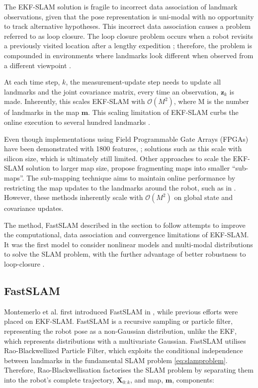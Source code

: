 The EKF-SLAM solution is fragile to incorrect data association of landmark observations, given that the pose representation is uni-modal with no opportunity to track alternative hypotheses. This incorrect data association causes a problem referred to as loop closure. The loop closure problem occurs when a robot revisits a previously visited location after a lengthy expedition \cite{Balcilar2016}; therefore, the problem is compounded in environments where landmarks look different when observed from a different viewpoint \cite{976019}. 

At each time step, $k$, the measurement-update step needs to update all landmarks and the joint covariance matrix, every time an observation, $\mathbf{z}_k$ is made. Inherently, this scales EKF-SLAM with $\mathcal{O}(M^2)$, where M is the number of landmarks in the map $\mathbf{m}$. This scaling limitation of EKF-SLAM curbs the online execution to several hundred landmarks \cite{4631503}. 

Even though implementations using Field Programmable Gate Arrays (FPGAs) have been demonstrated with 1800 features, \cite{4380720}; solutions such as this scale with silicon size, which is ultimately still limited. Other approaches to scale the EKF-SLAM solution to larger map size, propose fragmenting maps into smaller ``sub-maps''. The sub-mapping technique aims to maintain online performance by restricting the map updates to the landmarks around the robot, such as in \cite{Leonard2000, 973391, 938382, VIDALCALLEJA2011654, Quraishi2016}. However, these methods inherently scale with $\mathcal{O}(M^2)$ on global state and covariance updates.

The method, FastSLAM described in the section to follow attempts to improve the computational, data association and convergence limitations of EKF-SLAM. It was the first model to consider nonlinear models and multi-modal distributions to solve the SLAM problem, with the further advantage of better robustness to loop-closure \cite{Montemerlo2002}. 

\subsection{FastSLAM}
Montemerlo et al. first introduced FastSLAM in \cite{ Montemerlo2002}, while previous efforts were placed on EKF-SLAM. FastSLAM is a recursive sampling or particle filter, representing the robot pose as a non-Gaussian distribution, unlike the EKF, which represents distributions with a multivariate Gaussian. FastSLAM utilises Rao-Blackwellized Particle Filter, which exploits the conditional independence between landmarks in the fundamental SLAM problem \ref{eq:slamproblem}. Therefore, Rao-Blackwellisation factorises the SLAM problem by separating them into the robot's complete trajectory, $\mathbf{X}_{0:k}$, and map, $\mathbf{m}$, components:

